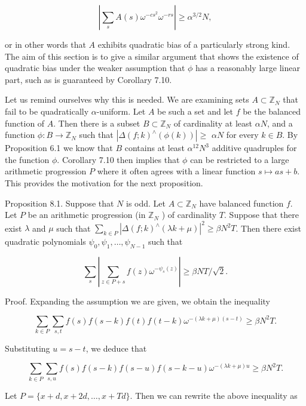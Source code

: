 \documentclass[10pt]{article}
\begin{document}
$$
\left|\sum_{s} A(s) \omega^{-c s^{2}} \omega^{-r s}\right| \geqslant \alpha^{3 / 2} N,
$$

or in other words that $A$ exhibits quadratic bias of a particularly strong kind. The aim of this section is to give a similar argument that shows the existence of quadratic bias under the weaker assumption that $\phi$ has a reasonably large linear part, such as is guaranteed by Corollary 7.10.

Let us remind ourselves why this is needed. We are examining sets $A \subset \mathbb{Z}_{N}$ that fail to be quadratically $\alpha$-uniform. Let $A$ be such a set and let $f$ be the balanced function of $A$. Then there is a subset $B \subset \mathbb{Z}_{N}$ of cardinality at least $\alpha N$, and a function $\phi: B \rightarrow \mathbb{Z}_{N}$ such that $\left|\Delta(f ; k)^{\wedge}(\phi(k))\right| \geqslant$ $\alpha N$ for every $k \in B$. By Proposition 6.1 we know that $B$ contains at least $\alpha^{12} N^{3}$ additive quadruples for the function $\phi$. Corollary 7.10 then implies that $\phi$ can be restricted to a large arithmetic progression $P$ where it often agrees with a linear function $s \mapsto a s+b$. This provides the motivation for the next proposition.

Proposition 8.1. Suppose that $N$ is odd. Let $A \subset \mathbb{Z}_{N}$ have balanced function $f$. Let $P$ be an arithmetic progression (in $\mathbb{Z}_{N}$ ) of cardinality $T$. Suppose that there exist $\lambda$ and $\mu$ such that $\sum_{k \in P}\left|\Delta(f ; k)^{\wedge}(\lambda k+\mu)\right|^{2} \geqslant \beta N^{2} T$. Then there exist quadratic polynomials $\psi_{0}, \psi_{1}, \ldots, \psi_{N-1}$ such that

$$
\sum_{s}\left|\sum_{z \in P+s} f(z) \omega^{-\psi_{s}(z)}\right| \geqslant \beta N T / \sqrt{2} .
$$

Proof. Expanding the assumption we are given, we obtain the inequality

$$
\sum_{k \in P} \sum_{s, t} f(s) f(s-k) f(t) f(t-k) \omega^{-(\lambda k+\mu)(s-t)} \geqslant \beta N^{2} T .
$$

Substituting $u=s-t$, we deduce that

$$
\sum_{k \in P} \sum_{s, u} f(s) f(s-k) f(s-u) f(s-k-u) \omega^{-(\lambda k+\mu) u} \geqslant \beta N^{2} T .
$$

Let $P=\{x+d, x+2 d, \ldots, x+T d\}$. Then we can rewrite the above inequality as
\end{document}
